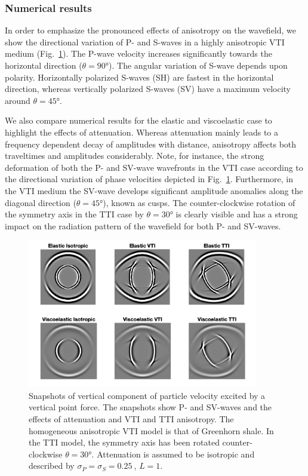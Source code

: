 \subsubsection{Numerical results}
In order to emphasize the pronounced effects of anisotropy on the wavefield, we show the directional variation of P- and S-waves in a highly anisotropic VTI medium (Fig.~\ref{fig:snapshots}). The P-wave velocity increases significantly towards the horizontal direction ($\theta = \ang{90}$). The angular variation of S-wave depends upon polarity. Horizontally polarized S-waves (SH) are fastest in the horizontal direction, whereas vertically polarized S-waves (SV) have a maximum velocity around $\theta = \ang{45}$.

We also compare numerical results for the elastic and viscoelastic
case to highlight the effects of attenuation. Whereas attenuation mainly leads to a frequency dependent decay of amplitudes with distance, anisotropy affects both traveltimes and amplitudes considerably. Note, for instance, the strong deformation of both the P- and SV-wave wavefronts in the VTI case according to the directional variation of phase velocities depicted in Fig.~\ref{fig:snapshots}. Furthermore, in the VTI medium the SV-wave develops significant amplitude anomalies along the diagonal direction ($\theta = \ang{45}$), known as cusps. The counter-clockwise rotation of the symmetry axis in the TTI case by $\theta = \ang{30}$ is clearly visible and has a strong impact on the radiation pattern of the wavefield for both P- and SV-waves.

\begin{figure}[h!]
    \centering
    \includegraphics[width=0.9\textwidth]{figures/modeling}
    \caption{Snapshots of vertical component of particle velocity excited by a vertical point force. The snapshots show P- and SV-waves and the effects of attenuation and VTI and TTI anisotropy. The homogeneous anisotropic VTI model is that of Greenhorn shale. In the TTI model, the symmetry axis has been rotated counter-clockwise $\theta = \ang{30}$. Attenuation is assumed to be isotropic and described by $\sigma_P=\sigma_S=\SI{0.25}{}$, $L=1$.}
    \label{fig:snapshots}
\end{figure}

